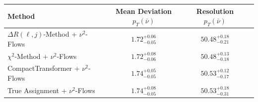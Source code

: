    \begin{tabular}{lccc}
        \toprule
        Method & Mean Deviation $p_{T}(\bar{\nu})$ & Resolution $p_{T}(\bar{\nu})$ \\
        \midrule
        $\Delta R(\ell,j)$-Method + $\nu^2$-Flows & $1.72^{+0.06}_{-0.05}$ & $50.48^{+0.18}_{-0.21}$ \\
        $\chi^2$-Method + $\nu^2$-Flows & $1.72^{+0.08}_{-0.06}$ & $50.48^{+0.13}_{-0.18}$ \\
        CompactTransformer + $\nu^2$-Flows & $1.74^{+0.05}_{-0.05}$ & $50.53^{+0.12}_{-0.17}$ \\
        True Assignment + $\nu^2$-Flows & $1.74^{+0.08}_{-0.05}$ & $50.53^{+0.18}_{-0.31}$ \\
        \bottomrule
    \end{tabular}